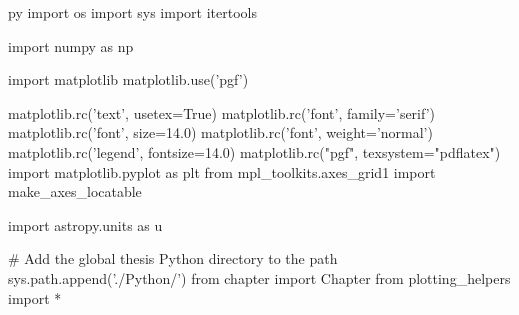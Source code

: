 \usepackage{pythontex}

\begin{pythontexcustomcode}[begin]{py}
import os
import sys
import itertools

import numpy as np

import matplotlib
matplotlib.use('pgf')

matplotlib.rc('text', usetex=True)
matplotlib.rc('font', family='serif')
matplotlib.rc('font', size=14.0)
matplotlib.rc('font', weight='normal')
matplotlib.rc('legend', fontsize=14.0)
matplotlib.rc("pgf", texsystem="pdflatex")
import matplotlib.pyplot as plt
from mpl_toolkits.axes_grid1 import make_axes_locatable

import astropy.units as u

# Add the global thesis Python directory to the path
sys.path.append('./Python/')
from chapter import Chapter
from plotting_helpers import *

\end{pythontexcustomcode}
